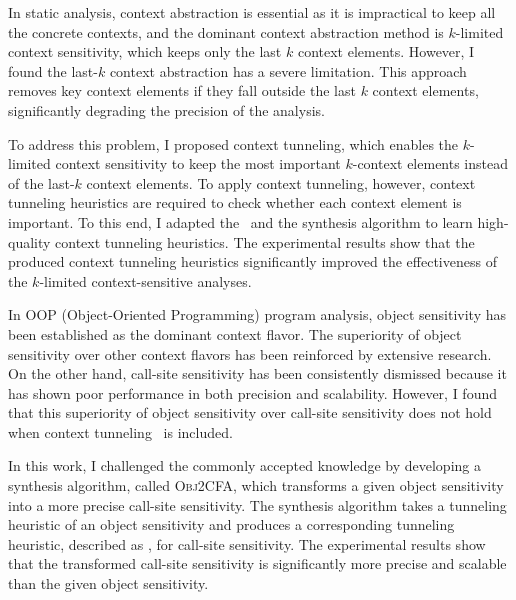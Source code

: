 \documentclass[11pt]{article}
\newcommand{\myparagraph}[1]{\medskip\noindent{\it \textbf{#1.}}}
\begin{document}
\myparagraph{Context Tunneling~\cite{JeJeOh18}}
%
In static analysis, context abstraction is essential as it is impractical to keep all the concrete contexts, and the dominant context abstraction method is $k$-limited context sensitivity, which keeps only the last $k$ context elements.
%
However, I found the last-$k$ context abstraction has a severe limitation. 
%
This approach removes key context elements if they fall outside the last $k$ context elements, significantly degrading the precision of the analysis.




To address this problem, I proposed context tunneling, which enables the $k$-limited context sensitivity to keep the most important $k$-context elements instead of the last-$k$ context elements.
%
To apply context tunneling, however, context tunneling heuristics are required to check whether each context element is important.
%
To this end, I adapted the \DisjunctiveModel~and the synthesis algorithm to learn high-quality context tunneling heuristics.
%
The experimental results show that the produced context tunneling heuristics significantly improved the effectiveness of the $k$-limited context-sensitive analyses.




\myparagraph{Obj2CFA~\cite{JeOh22}}
%
In OOP (Object-Oriented Programming) program analysis, object sensitivity has been established as the dominant context flavor.
%
The superiority of object sensitivity over other context flavors has been reinforced by extensive research.
%
On the other hand, call-site sensitivity has been consistently dismissed because it has shown poor performance in both precision and scalability.
%
However, I found that this superiority of object sensitivity over call-site sensitivity does not hold when context tunneling~\cite{JeJeOh18} is included. 


In this work, I challenged the commonly accepted knowledge by developing a synthesis algorithm, called \textsc{Obj2CFA}, which transforms a given object sensitivity into a more precise call-site sensitivity.
%
The synthesis algorithm takes a tunneling heuristic of an object sensitivity and produces a corresponding tunneling heuristic, described as \DisjunctiveModel, for call-site sensitivity.
%
The experimental results show that the transformed call-site sensitivity is significantly more precise and scalable than the given object sensitivity.
\end{document}
